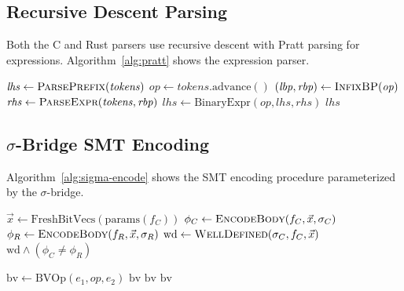 \documentclass[11pt,a4paper]{article}
\begin{document}
\begin{appendices}
\subsection{Recursive Descent Parsing}

Both the C and Rust parsers use recursive descent with Pratt parsing
for expressions.  Algorithm~\ref{alg:pratt} shows the expression parser.

\begin{algorithm}[h]
\caption{Pratt Expression Parser}\label{alg:pratt}
\begin{algorithmic}[1]
  \State $\mathit{lhs} \gets \Call{ParsePrefix}{\mathit{tokens}}$
    \State $\mathit{op} \gets \mathit{tokens}.\text{advance}()$
    \State $(\mathit{lbp}, \mathit{rbp}) \gets \Call{InfixBP}{\mathit{op}}$
    \State $\mathit{rhs} \gets \Call{ParseExpr}{\mathit{tokens}, \mathit{rbp}}$
    \State $\mathit{lhs} \gets \text{BinaryExpr}(\mathit{op}, \mathit{lhs}, \mathit{rhs})$
  \EndWhile
  \State \Return $\mathit{lhs}$
\EndProcedure
\end{algorithmic}
\end{algorithm}

\subsection{$\sigma$-Bridge SMT Encoding}

Algorithm~\ref{alg:sigma-encode} shows the SMT encoding procedure
parameterized by the $\sigma$-bridge.

\begin{algorithm}[h]
\caption{$\sigma$-Bridge SMT Encoding}\label{alg:sigma-encode}
\begin{algorithmic}[1]
  \State $\vec{x} \gets \text{FreshBitVecs}(\text{params}(f_C))$
  \State $\phi_C \gets \Call{EncodeBody}{f_C, \vec{x}, \sigma_C}$
  \State $\phi_R \gets \Call{EncodeBody}{f_R, \vec{x}, \sigma_R}$
  \State $\text{wd} \gets \Call{WellDefined}{\sigma_C, f_C, \vec{x}}$
  \State \Return $\text{wd} \wedge (\phi_C \neq \phi_R)$
\EndProcedure

  \State $\text{bv} \gets \text{BVOp}(e_1, op, e_2)$
    \State \Return $\text{bv}$ 
    \State \Return $\text{bv}$ 
    \State \Return $\text{bv}$ 
  \EndIf
\EndProcedure
\end{algorithmic}
\end{algorithm}


\end{appendices}
\end{document}
